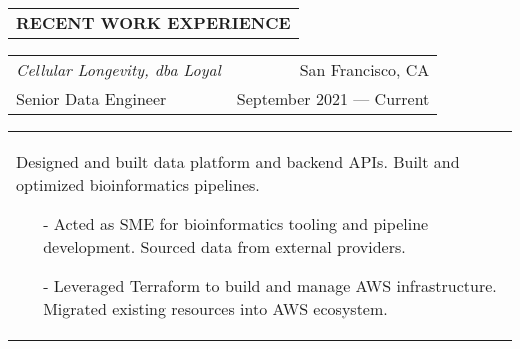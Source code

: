 \begin{tabularx}{\textwidth}{L}
    \textbf{RECENT WORK EXPERIENCE}
\end{tabularx}

\begin{tabularx}{\textwidth}{L R}
    \normalsize\textit{Cellular Longevity, dba Loyal} & San Francisco, CA \\
    \hspace{10pt}Senior Data Engineer & September 2021 --- Current \\
\end{tabularx}
\begin{tabularx}{\textwidth}{X}
    \hspace{10pt}Designed and built data platform and backend APIs. Built and optimized bioinformatics pipelines.
    \begin{itemize}
        \itemsep{}
        \item[-] Acted as SME for bioinformatics tooling and pipeline development. Sourced data from external providers.
        \item[-] Leveraged Terraform to build and manage AWS infrastructure. Migrated existing resources into AWS ecosystem.
    \end{itemize}
\end{tabularx}

